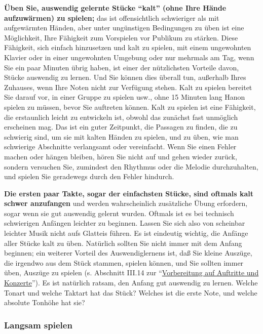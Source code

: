\textbf{Üben Sie, auswendig gelernte Stücke \enquote{kalt} (ohne Ihre Hände aufzuwärmen) zu spielen;} das ist offensichtlich schwieriger als mit aufgewärmten Händen, aber unter ungünstigen Bedingungen zu üben ist eine Möglichkeit, Ihre Fähigkeit zum Vorspielen vor Publikum zu stärken.
Diese Fähigkeit, sich einfach hinzusetzen und kalt zu spielen, mit einem ungewohnten Klavier oder in einer ungewohnten Umgebung oder nur mehrmals am Tag, wenn Sie ein paar Minuten übrig haben, ist einer der nützlichsten Vorteile davon, Stücke auswendig zu lernen.
Und Sie können dies überall tun, außerhalb Ihres Zuhauses, wenn Ihre Noten nicht zur Verfügung stehen.
Kalt zu spielen bereitet Sie darauf vor, in einer Gruppe zu spielen usw., ohne 15 Minuten lang Hanon spielen zu müssen, bevor Sie auftreten können.
Kalt zu spielen ist eine Fähigkeit, die erstaunlich leicht zu entwickeln ist, obwohl das zunächst fast unmöglich erscheinen mag.
Das ist ein guter Zeitpunkt, die Passagen zu finden, die zu schwierig sind, um sie mit kalten Händen zu spielen, und zu üben, wie man schwierige Abschnitte verlangsamt oder vereinfacht.
Wenn Sie einen Fehler machen oder hängen bleiben, hören Sie nicht auf und gehen wieder zurück, sondern versuchen Sie, zumindest den Rhythmus oder die Melodie durchzuhalten, und spielen Sie geradewegs durch den Fehler hindurch.

\textbf{Die ersten paar Takte, sogar der einfachsten Stücke, sind oftmals kalt schwer anzufangen} und werden wahrscheinlich zusätzliche Übung erfordern, sogar wenn sie gut auswendig gelernt wurden.
Oftmals ist es bei technisch schwierigen Anfängen leichter zu beginnen.
Lassen Sie sich also von scheinbar leichter Musik nicht aufs Glatteis führen.
Es ist eindeutig wichtig, die Anfänge aller Stücke kalt zu üben.
Natürlich sollten Sie nicht immer mit dem Anfang beginnen; ein weiterer Vorteil des Auswendiglernens ist, daß Sie kleine Auszüge, die irgendwo aus dem Stück stammen, spielen können, und Sie sollten immer üben, Auszüge zu spielen (s. Abschnitt III.14 zur \enquote{\hyperref[c1iii14]{Vorbereitung auf Auftritte und Konzerte}}).
Es ist natürlich ratsam, den Anfang gut auswendig zu lernen.
Welche Tonart und welche Taktart hat das Stück?
Welches ist die erste Note, und welche absolute Tonhöhe hat sie?
 

\subsubsection{Langsam spielen}
\label{c1iii6h}

